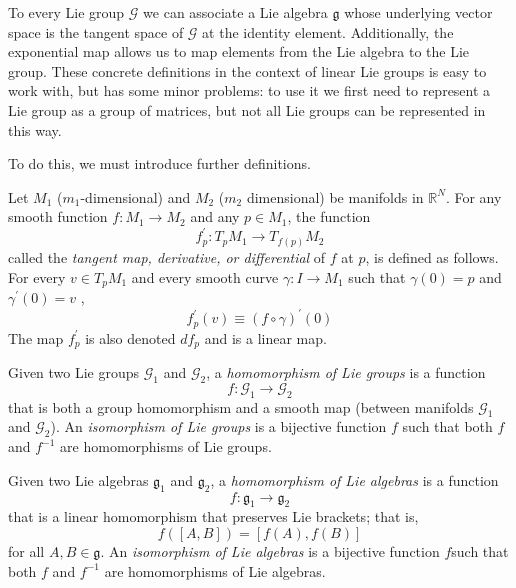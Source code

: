 \documentclass{article}
\begin{document}
    To every Lie group $\mathcal{G}$ we can associate a Lie algebra $\mathfrak{g}$ whose underlying vector space is the tangent space of $\mathcal{G}$ at the identity element. Additionally, the exponential map allows us to map elements from the Lie algebra to the Lie group. These concrete definitions in the context of linear Lie groups is easy to work with, but has some minor problems: to use it we first need to represent a Lie group as a group of matrices, but not all Lie groups can be represented in this way. 

    To do this, we must introduce further definitions. 

    \begin{definition}
      Let $M_1$ ($m_1$-dimensional) and $M_2$ ($m_2$ dimensional) be manifolds in $\mathbb{R}^N$. For any smooth function $f: M_1 \longrightarrow M_2$ and any $p \in M_1$, the function 
      \begin{equation}
        f^\prime_p: T_p M_1 \longrightarrow T_{f(p)} M_2
      \end{equation}
      called the \textit{tangent map, derivative, or differential} of $f$ at $p$, is defined as follows. For every $v \in T_p M_1$ and every smooth curve $\gamma: I \longrightarrow M_1$ such that $\gamma(0) = p$ and $\gamma^\prime (0) = v$ , 
      \begin{equation}
        f^\prime_p(v) \equiv (f \circ \gamma)^\prime (0)
      \end{equation}
      The map $f^\prime_p$ is also denoted $d f_p$ and is a linear map. 
    \end{definition}

    \begin{definition}
      Given two Lie groups $\mathcal{G}_1$ and $\mathcal{G}_2$, a \textit{homomorphism of Lie groups} is a function 
      \begin{equation}
        f: \mathcal{G}_1 \longrightarrow \mathcal{G}_2
      \end{equation}
      that is both a group homomorphism and a smooth map (between manifolds $\mathcal{G}_1$ and $\mathcal{G}_2$). An \textit{isomorphism of Lie groups} is a bijective function $f$ such that both $f$ and $f^{-1}$ are homomorphisms of Lie groups. 
    \end{definition}

    \begin{definition}
      Given two Lie algebras $\mathfrak{g}_1$ and $\mathfrak{g}_2$, a \textit{homomorphism of Lie algebras} is a function 
      \begin{equation}
        f: \mathfrak{g}_1 \longrightarrow \mathfrak{g}_2
      \end{equation}
      that is a linear homomorphism that preserves Lie brackets; that is, 
      \begin{equation}
        f([A,B]) = [f(A), f(B)]
      \end{equation}
      for all $A, B \in \mathfrak{g}$. An \textit{isomorphism of Lie algebras} is a bijective function $f$such that both $f$ and $f^{-1}$ are homomorphisms of Lie algebras. 
    \end{definition}
\end{document}
